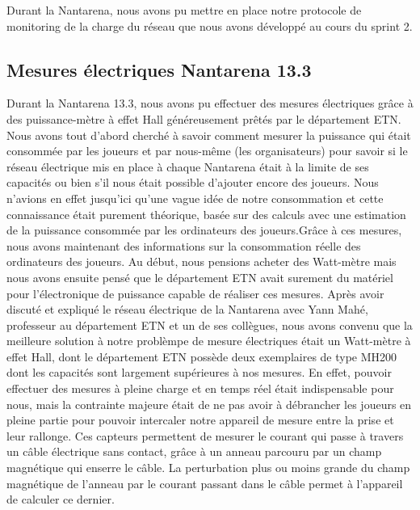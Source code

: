 \documentclass[french]{article}
\begin{document}
Durant la Nantarena, nous avons pu mettre en place notre protocole de monitoring de la charge du réseau que nous avons développé au cours du sprint 2.

\newpage

\subsection{Mesures électriques Nantarena 13.3}

Durant la Nantarena 13.3, nous avons pu effectuer des mesures électriques grâce à des puissance-mètre à effet Hall généreusement prêtés par le département ETN. \newline \newline
Nous avons tout d'abord cherché à savoir comment mesurer la puissance qui était consommée par les joueurs et par nous-même (les organisateurs) pour savoir si le réseau électrique mis en place à chaque Nantarena était à la limite de ses capacités ou bien s'il nous était possible d'ajouter encore des joueurs. Nous n'avions en effet jusqu'ici qu'une vague idée de notre consommation et cette connaissance était purement théorique, basée sur des calculs avec une estimation de la puissance consommée par les ordinateurs des joueurs.Grâce à ces mesures, nous avons maintenant des informations sur la consommation réelle des ordinateurs des joueurs. \newline \newline
Au début, nous pensions acheter des Watt-mètre mais nous avons ensuite pensé que le département ETN avait surement du matériel pour l'électronique de puissance capable de réaliser ces mesures.
Après avoir discuté et expliqué le réseau électrique de la Nantarena avec Yann Mahé, professeur au département ETN et un de ses collègues, nous avons convenu que la meilleure solution à notre problèmpe de mesure électriques était un Watt-mètre à effet Hall, dont le département ETN possède deux exemplaires de type MH200 dont les capacités sont largement supérieures à nos mesures. En effet, pouvoir effectuer des mesures à pleine charge et en temps réel était indispensable pour nous, mais la contrainte majeure était de ne pas avoir à débrancher les joueurs en pleine partie pour pouvoir intercaler notre appareil de mesure entre la prise et leur rallonge. \newline \newline
Ces capteurs permettent de mesurer le courant qui passe à travers un câble électrique sans contact, grâce à un anneau  parcouru par un champ magnétique qui enserre le câble. La perturbation plus ou moins grande du champ magnétique de l'anneau par le courant passant dans le câble permet à l'appareil de calculer ce dernier.
\end{document}
